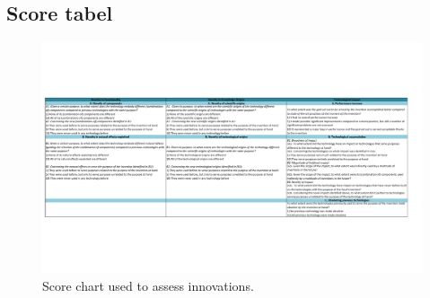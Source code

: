 \appendix
\tocless \chapter{}
\begin{landscape}
	\section{Score tabel}
		\begin{figure}[htp]
		\begin{center}
		  \includegraphics[width=\linewidth, trim=5 150 60 150]{img/score.pdf}
		  \caption{Score chart used to assess innovations.}
		  \label{fig:score}
		\end{center}
		\end{figure}
\end{landscape}